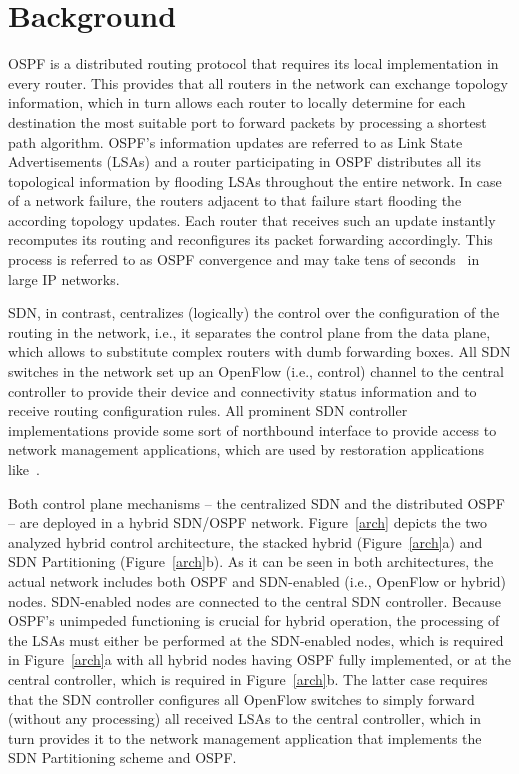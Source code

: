 \documentclass[10pt, conference]{IEEEtran}
\begin{document}
\section {Background}\label{arch-section}
OSPF is a distributed routing protocol that requires its local implementation in every router. This provides that all routers in the network can exchange topology information, which in turn allows each router to locally determine for each destination the most suitable port to forward packets by processing a shortest path algorithm. OSPF's information updates are referred to as Link State Advertisements (LSAs) and a router participating in OSPF distributes all its topological information by flooding LSAs throughout the entire network. In case of a network failure, the routers adjacent to that failure start flooding the according topology updates. Each router that receives such an update instantly recomputes its routing and reconfigures its packet forwarding accordingly. This process is referred to as OSPF convergence and may take tens of seconds~\cite{ospf_convergence} in large IP networks.

SDN, in contrast, centralizes (logically) the control over the configuration of the routing in the network, i.e., it separates the control plane from the data plane, which allows to substitute complex routers with dumb forwarding boxes. All SDN switches in the network set up an OpenFlow (i.e., control) channel to the central controller to provide their device and connectivity status information and to receive routing configuration rules. All prominent SDN controller implementations provide some sort of northbound interface to provide access to network management applications, which are used by restoration applications like~\cite{ciena-protect}.

Both control plane mechanisms -- the centralized SDN and the distributed OSPF -- are deployed in a hybrid SDN/OSPF network. Figure~\ref{arch} depicts the two analyzed hybrid control architecture, the stacked hybrid (Figure~\ref{arch}a) and SDN Partitioning (Figure~\ref{arch}b). As it can be seen in both architectures, the actual network includes both OSPF and SDN-enabled (i.e., OpenFlow or hybrid) nodes. SDN-enabled nodes are connected to the central SDN controller. Because OSPF's unimpeded functioning is crucial for hybrid operation, the processing of the LSAs must either be performed at the SDN-enabled nodes, which is required in Figure~\ref{arch}a with all hybrid nodes having OSPF fully implemented, or at the central controller, which is required in Figure~\ref{arch}b. The latter case requires that the SDN controller configures all OpenFlow switches to simply forward (without any processing) all received LSAs to the central controller, which in turn provides it to the network management application that implements the SDN Partitioning scheme and OSPF.
\end{document}

